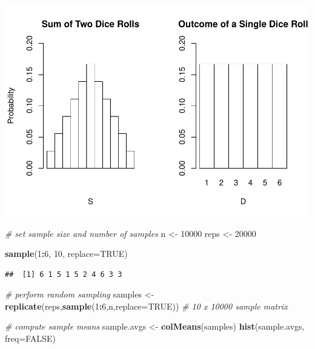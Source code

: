 \documentclass[
]{book}
\newenvironment{Shaded}{\begin{snugshade}}{\end{snugshade}}
\newcommand{\CommentTok}[1]{\textcolor[rgb]{0.56,0.35,0.01}{\textit{#1}}}
\newcommand{\DataTypeTok}[1]{\textcolor[rgb]{0.13,0.29,0.53}{#1}}
\newcommand{\DecValTok}[1]{\textcolor[rgb]{0.00,0.00,0.81}{#1}}
\newcommand{\KeywordTok}[1]{\textcolor[rgb]{0.13,0.29,0.53}{\textbf{#1}}}
\newcommand{\NormalTok}[1]{#1}
\newcommand{\OperatorTok}[1]{\textcolor[rgb]{0.81,0.36,0.00}{\textbf{#1}}}
\newcommand{\OtherTok}[1]{\textcolor[rgb]{0.56,0.35,0.01}{#1}}
\newcommand{\StringTok}[1]{\textcolor[rgb]{0.31,0.60,0.02}{#1}}
\begin{document}
\includegraphics{Metrics_files/figure-latex/unnamed-chunk-13-1.pdf}

\begin{Shaded}
\begin{Highlighting}[]
\CommentTok{# set sample size and number of samples}
\NormalTok{n <-}\StringTok{ }\DecValTok{10000}
\NormalTok{reps <-}\StringTok{ }\DecValTok{20000}

\KeywordTok{sample}\NormalTok{(}\DecValTok{1}\OperatorTok{:}\DecValTok{6}\NormalTok{, }\DecValTok{10}\NormalTok{, }\DataTypeTok{replace=}\OtherTok{TRUE}\NormalTok{)}
\end{Highlighting}
\end{Shaded}

\begin{verbatim}
##  [1] 6 1 5 1 5 2 4 6 3 3
\end{verbatim}

\begin{Shaded}
\begin{Highlighting}[]
\CommentTok{# perform random sampling}
\NormalTok{samples <-}\StringTok{ }\KeywordTok{replicate}\NormalTok{(reps,}\KeywordTok{sample}\NormalTok{(}\DecValTok{1}\OperatorTok{:}\DecValTok{6}\NormalTok{,n,}\DataTypeTok{replace=}\OtherTok{TRUE}\NormalTok{)) }\CommentTok{# 10 x 10000 sample matrix}

\CommentTok{# compute sample means}
\NormalTok{sample.avgs <-}\StringTok{ }\KeywordTok{colMeans}\NormalTok{(samples)}
\KeywordTok{hist}\NormalTok{(sample.avgs, }\DataTypeTok{freq=}\OtherTok{FALSE}\NormalTok{)}
\end{Highlighting}
\end{Shaded}
\end{document}
